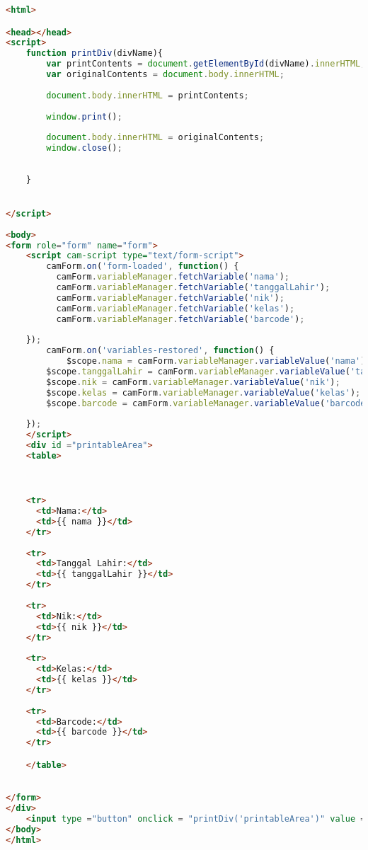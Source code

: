 \begin{lstlisting}[language=html,basicstyle=\tiny,caption=cetak-kartu.html]
<html>

<head></head>
<script>
	function printDiv(divName){
		var printContents = document.getElementById(divName).innerHTML;
		var originalContents = document.body.innerHTML;
		
		document.body.innerHTML = printContents;
		
		window.print();
		
		document.body.innerHTML = originalContents;
		window.close();
	
	
	}


</script>
	
<body>
<form role="form" name="form">
	<script cam-script type="text/form-script">
    	camForm.on('form-loaded', function() {
	      camForm.variableManager.fetchVariable('nama');
	      camForm.variableManager.fetchVariable('tanggalLahir');
	      camForm.variableManager.fetchVariable('nik');
	      camForm.variableManager.fetchVariable('kelas');
	      camForm.variableManager.fetchVariable('barcode');
	      
    });
    	camForm.on('variables-restored', function() {
			$scope.nama = camForm.variableManager.variableValue('nama');
	    $scope.tanggalLahir = camForm.variableManager.variableValue('tanggalLahir');
	    $scope.nik = camForm.variableManager.variableValue('nik');
	    $scope.kelas = camForm.variableManager.variableValue('kelas');
	    $scope.barcode = camForm.variableManager.variableValue('barcode');
	      
    });
  	</script>
  	<div id ="printableArea">
  	<table>
  	


    <tr>
      <td>Nama:</td>
      <td>{{ nama }}</td>
    </tr>
    
    <tr>
      <td>Tanggal Lahir:</td>
      <td>{{ tanggalLahir }}</td>
    </tr>
    
    <tr>
      <td>Nik:</td>
      <td>{{ nik }}</td>
    </tr>
    
    <tr>
      <td>Kelas:</td>
      <td>{{ kelas }}</td>
    </tr>
    
    <tr>
      <td>Barcode:</td>
      <td>{{ barcode }}</td>
    </tr>

    </table>
    

</form> 
</div>
    <input type ="button" onclick = "printDiv('printableArea')" value = "Cetak Kartu"/>
</body>
</html>
\end{lstlisting}